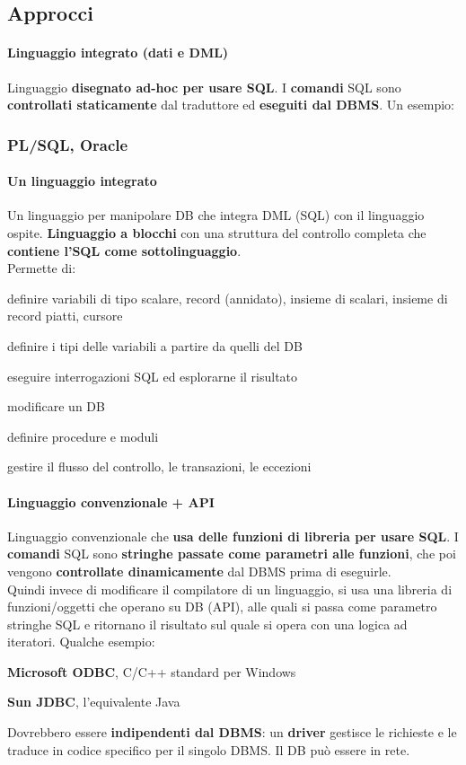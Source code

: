 \documentclass[10pt]{book}
\begin{document}
\subsection{Approcci}
\paragraph{Linguaggio integrato (dati e DML)} Linguaggio \textbf{disegnato ad-hoc per usare SQL}. I \textbf{comandi} SQL sono \textbf{controllati staticamente} dal traduttore ed \textbf{eseguiti dal DBMS}. Un esempio:
\subsubsection{PL/SQL, Oracle}
\paragraph{Un linguaggio integrato} Un linguaggio per manipolare DB che integra DML (SQL) con il linguaggio ospite. \textbf{Linguaggio a blocchi} con una struttura del controllo completa che \textbf{contiene l'SQL come sottolinguaggio}.\\
Permette di:
\begin{list}{}{}
	\item definire variabili di tipo scalare, record (annidato), insieme di scalari, insieme di record piatti, cursore
	\item definire i tipi delle variabili a partire da quelli del DB
	\item eseguire interrogazioni SQL ed esplorarne il risultato
	\item modificare un DB
	\item definire procedure e moduli
	\item gestire il flusso del controllo, le transazioni, le eccezioni
\end{list}
\paragraph{Linguaggio convenzionale + API} Linguaggio convenzionale che \textbf{usa delle funzioni di libreria per usare SQL}. I \textbf{comandi} SQL sono \textbf{stringhe passate come parametri alle funzioni}, che poi vengono \textbf{controllate dinamicamente} dal DBMS prima di eseguirle.\\
Quindi invece di modificare il compilatore di un linguaggio, si usa una libreria di funzioni/oggetti che operano su DB (API), alle quali si passa come parametro stringhe SQL e ritornano il risultato sul quale si opera con una logica ad iteratori. Qualche esempio:
\begin{list}{}{}
	\item \textbf{Microsoft ODBC}, C/C++ standard per Windows
	\item \textbf{Sun JDBC}, l'equivalente Java
\end{list}
Dovrebbero essere \textbf{indipendenti dal DBMS}: un \textbf{driver} gestisce le richieste e le traduce in codice specifico per il singolo DBMS. Il DB può essere in rete.
\end{document}

